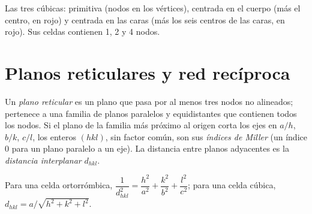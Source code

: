 \begin{omfigure}

{\small Las tres  cúbicas: primitiva (nodos en los vértices),
centrada en el cuerpo (más el centro, en rojo) y centrada en las caras (más los seis centros
de las caras, en rojo). Sus celdas contienen 1, 2 y 4 nodos.}
\end{omfigure}

\section{Planos reticulares y red recíproca}

\begin{definition}\label{def:b3:x-ray-diffraction:miller}
Un \emph{plano reticular} es un plano que pasa por al menos tres
nodos no alineados; pertenece a una familia de planos paralelos y equidistantes
que contienen todos los nodos. Si el plano de la familia más próximo al origen corta
los ejes en $a/h$, $b/k$, $c/l$, los enteros $(hkl)$, sin factor común,
son sus \emph{índices de Miller} (un índice 0 para un plano
paralelo a un eje). La distancia entre planos adyacentes es la
\emph{distancia interplanar} $d_{hkl}$.
\end{definition}

\begin{proposition}\label{prop:b3:x-ray-diffraction:spacing}
Para una celda ortorrómbica, $\dfrac{1}{d_{hkl}^2} = \dfrac{h^2}{a^2} + \dfrac{k^2}{b^2} +
\dfrac{l^2}{c^2}$; para una celda cúbica, $d_{hkl} = a/\sqrt{h^2 + k^2 + l^2}$.
\end{proposition}

